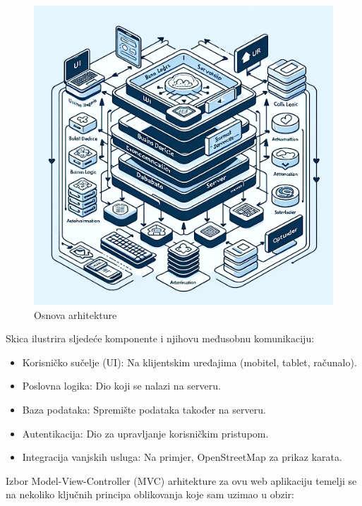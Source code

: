 		\begin{figure}[H]
			\includegraphics[width=\textwidth]{slike/arhitektura.PNG} %
			\centering
			\caption{Osnova arhitekture}
			\label{fig5:promjene}
		\end{figure}
		
		\eject
	
  Skica ilustrira sljedeće komponente i njihovu međusobnu komunikaciju:
   \begin{itemize}
		  \item {Korisničko sučelje (UI): Na klijentskim uređajima (mobitel, tablet, računalo).}
		  \item {Poslovna logika: Dio koji se nalazi na serveru.}	
            \item {Baza podataka: Spremište podataka također na serveru.}
		  \item {Autentikacija: Dio za upravljanje korisničkim pristupom.}	
            \item {Integracija vanjskih usluga: Na primjer, OpenStreetMap za prikaz karata.}
	   \end{itemize}

Izbor Model-View-Controller (MVC) arhitekture za ovu web aplikaciju temelji se na nekoliko ključnih principa oblikovanja koje sam uzimao u obzir:

	\eject

